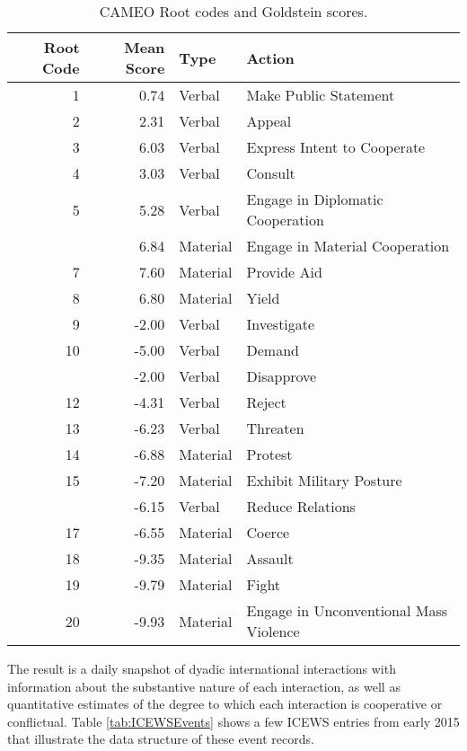 \documentclass[10pt,]{article}
\begin{document}
\begin{table}

\caption{\label{tab:RootCodes}CAMEO Root codes and Goldstein scores.}
\centering
\begin{tabular}[t]{rrll}
\toprule
Root Code & Mean Score & Type & Action\\
\midrule
1 & 0.74 & Verbal & Make Public Statement\\
2 & 2.31 & Verbal & Appeal\\
3 & 6.03 & Verbal & Express Intent to Cooperate\\
4 & 3.03 & Verbal & Consult\\
5 & 5.28 & Verbal & Engage in Diplomatic Cooperation\\
\addlinespace
6 & 6.84 & Material & Engage in Material Cooperation\\
7 & 7.60 & Material & Provide Aid\\
8 & 6.80 & Material & Yield\\
9 & -2.00 & Verbal & Investigate\\
10 & -5.00 & Verbal & Demand\\
\addlinespace
11 & -2.00 & Verbal & Disapprove\\
12 & -4.31 & Verbal & Reject\\
13 & -6.23 & Verbal & Threaten\\
14 & -6.88 & Material & Protest\\
15 & -7.20 & Material & Exhibit Military Posture\\
\addlinespace
16 & -6.15 & Verbal & Reduce Relations\\
17 & -6.55 & Material & Coerce\\
18 & -9.35 & Material & Assault\\
19 & -9.79 & Material & Fight\\
20 & -9.93 & Material & Engage in Unconventional Mass Violence\\
\bottomrule
\end{tabular}
\end{table}

The result is a daily snapshot of dyadic international interactions with
information about the substantive nature of each interaction, as well as
quantitative estimates of the degree to which each interaction is
cooperative or conflictual. Table \ref{tab:ICEWSEvents} shows a few
ICEWS entries from early 2015 that illustrate the data structure of
these event records.
\end{document}
